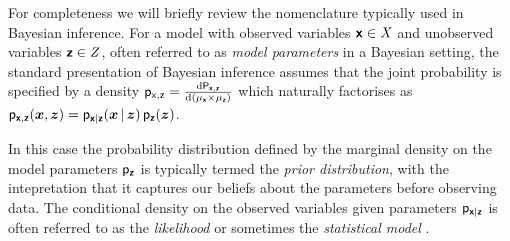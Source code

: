 
For completeness we will briefly review the nomenclature typically used in Bayesian inference. For a model with observed variables $\boldsymbol{\mathsf{x}} \in \mathit{X}$ and unobserved variables $\boldsymbol{\mathsf{z}} \in \mathit{Z}$, often referred to as \emph{model parameters} in a Bayesian setting, the standard presentation of Bayesian inference assumes that the joint probability is specified by a density $\mathsf{p}_{\mathsf{x},\mathsf{z}} = \frac{\mathrm{d} \mathsf{P}_{\boldsymbol{\mathsf{x}},\boldsymbol{\mathsf{z}}}}{\mathrm{d} (\mu_{\boldsymbol{\mathsf{x}}} \times \mu_{\boldsymbol{\mathsf{z}}})}$ which naturally factorises as $\mathsf{p}_{\boldsymbol{\mathsf{x}},\boldsymbol{\mathsf{z}}}(\boldsymbol{x},\boldsymbol{z}) = \mathsf{p}_{\boldsymbol{\mathsf{x}}|\boldsymbol{\mathsf{z}}}(\boldsymbol{x}\operatorname{|}\boldsymbol{z})\,\mathsf{p}_{\boldsymbol{\mathsf{z}}}(\boldsymbol{z})$. 

In this case the probability distribution defined by the marginal density on the model parameters $\mathsf{p}_{\boldsymbol{\mathsf{z}}}$ is typically termed the \emph{prior distribution}, with the intepretation that it captures our beliefs about the parameters before observing data. The conditional density on the observed variables given parameters $\mathsf{p}_{\boldsymbol{\mathsf{x}}|\boldsymbol{\mathsf{z}}}$ is often referred to as the \emph{likelihood} or sometimes the \emph{statistical model} \citep{robert2007bayesian}.%


